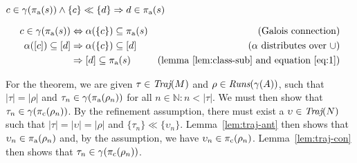 
\begin{lemma} \label{lem:traj-ant}
$c \in \gamma(\operatorname{\pi_{\textrm{a}}}(s)) \wedge \{ c \} \ll \{ d \} \Rightarrow d \in \operatorname{\pi_{\textrm{a}}}(s)$
\end{lemma}
%
\begin{align}
c \in \gamma(\operatorname{\pi_{\textrm{a}}}(s))      & \Leftrightarrow     \alpha(\{ c \}) \subseteq \operatorname{\pi_{\textrm{a}}}(s) \label{eq:1} & (\textrm{Galois connection}) \\
\alpha([c]) \subseteq [d] & \Rightarrow \alpha(\{ c \}) \subseteq [d]        \nonumber    & (\alpha \textrm{ distributes over } \cup) \\
                                  & \Rightarrow [d] \subseteq \operatorname{\pi_{\textrm{a}}}(s)         \nonumber    & (\textrm{lemma~\ref{lem:class-sub} and equation } \ref{eq:1})
\end{align}


For the theorem, we are given $\tau \in \operatorname{\textit{Traj}}(M)$ and $\rho \in \operatorname{\textit{Runs}}(\gamma(A))$, such that $| \tau | = | \rho |$ and $\tau_{n} \in \gamma(\operatorname{\pi_{\textrm{a}}}(\rho_{n}))$ for all $n \in \mathbb{N} : n < | \tau |$. We must then show that $\tau_{n} \in \gamma(\operatorname{\pi_{\textrm{c}}}(\rho_{n}))$. By the refinement assumption, there must exist a $\upsilon \in \operatorname{\textit{Traj}}(N)$ such that $| \tau | = | \upsilon | = | \rho |$ and $\{ \tau_{n} \} \ll \{ \upsilon_{n} \}$. Lemma~\ref{lem:traj-ant} then shows that $\upsilon_{n} \in \operatorname{\pi_{\textrm{a}}}(\rho_{n})$ and, by the assumption, we have $\upsilon_{n} \in \operatorname{\pi_{\textrm{c}}}(\rho_{n})$. Lemma~\ref{lem:traj-con} then shows that $\tau_{n} \in \gamma(\operatorname{\pi_{\textrm{c}}}(\rho_{n}))$. %

